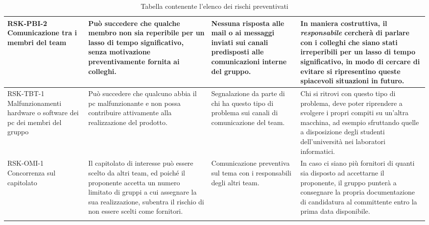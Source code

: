 \begin{center}
\begin{longtable}{|p{3cm}|p{4cm}|p{3.5cm}|p{3.5cm}|}
		\hline
	RSK-PBI-2 \newline Comunicazione tra i membri del team
	 & 
	Può succedere che qualche membro non sia reperibile per un lasso di tempo significativo, senza motivazione preventivamente fornita ai colleghi.
	&   

	Nessuna risposta alle mail o ai messaggi inviati sui canali predisposti alle comunicazioni interne del gruppo.
	 
	& In maniera costruttiva, il \textit{responsabile}
	   cercherà di parlare con i colleghi che siano stati irreperibili per un lasso di tempo significativo, in modo di cercare di evitare si ripresentino queste spiacevoli situazioni in futuro. \\
	\hline
	
			\hline
	RSK-TBT-1 \newline Malfunzionamenti hardware o software dei pc dei membri del gruppo
	 & 
	Può succedere che qualcuno abbia il pc malfunzionante e non possa contribuire attivamente alla realizzazione del prodotto.
	&   

	Segnalazione da parte di chi ha questo tipo di problema sui canali di comunicazione del team.
	 
	& Chi si ritrovi con questo tipo di problema, deve poter riprendere a svolgere i propri compiti su un'altra macchina, ad esempio sfruttando quelle a disposizione degli studenti dell'università nei laboratori informatici. \\
	\hline
	
	
				\hline
	RSK-OMI-1 \newline Concorrenza sul capitolato
	 & 
	Il capitolato di interesse può essere scelto da altri team, ed poiché il proponente accetta un numero limitato di gruppi a cui assegnare la sua realizzazione, subentra il rischio di non essere scelti come fornitori.
	&   

	Comunicazione preventiva sul tema con i responsabili degli altri team.
	 
	& In caso ci siano più fornitori di quanti sia disposto ad accettarne il proponente, il gruppo punterà a consegnare la propria documentazione di candidatura al committente entro la prima data disponibile. \\
	\hline
	
		\caption{Tabella contenente l'elenco dei rischi preventivati}
	\end{longtable}

\end{center}

